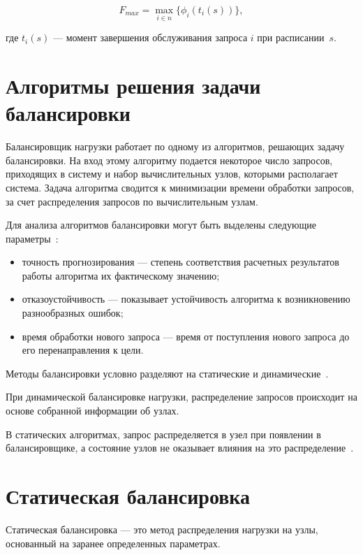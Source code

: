 \begin{equation}
	\label{eq:main_task}	
	F_{max} =   \max_{i \in n} \{\phi_i(t_i(s))\}, 
\end{equation}

где $t_i(s)$ --- момент завершения обслуживания запроса $i$ при расписании~$s$.

\section{Алгоритмы решения задачи балансировки}

Балансировщик нагрузки работает по одному из алгоритмов, решающих задачу балансировки. На вход этому алгоритму подается некоторое число запросов, приходящих в систему и набор вычислительных узлов, которыми располагает система. Задача алгоритма сводится к минимизации времени обработки запросов, за счет распределения запросов по вычислительным узлам.

Для анализа алгоритмов балансировки могут быть выделены следующие параметры~\cite{com_analysis}:
\begin{itemize}
	\item точность прогнозирования --- степень соответствия расчетных результатов работы алгоритма их фактическому значению;  
	\item отказоустойчивость --- показывает устойчивость
	алгоритма к возникновению разнообразных ошибок;
	\item время обработки нового запроса --- время от поступления нового запроса до его перенаправления к цели.
\end{itemize}

Методы балансировки условно разделяют на статические и динамические~\cite{drr, com_analysis, rate_comp}. 

При динамической балансировке нагрузки, распределение запросов происходит на основе собранной информации об узлах. 

В статических алгоритмах, запрос распределяется в узел при появлении в балансировщике, а состояние узлов не оказывает влияния на это распределение~\cite{rate_comp, com_analysis}.


\section{Статическая балансировка}

Статическая балансировка --- это метод распределения нагрузки на узлы, основанный на заранее определенных параметрах.

